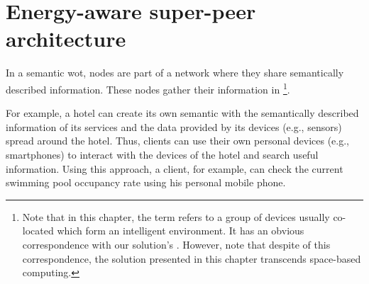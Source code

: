 \section{Energy-aware super-peer architecture} %
\label{proposal}




In a semantic \ac{wot}, nodes are part of a network where they share semantically described information.
These nodes gather their information in \Spaces{}
\footnote{
Note that in this chapter, the term \Space{} refers to a group of devices usually co-located which form an intelligent environment.
It has an obvious correspondence with our solution's \outerspace{}.
However, note that despite of this correspondence, the solution presented in this chapter transcends space-based computing.
}.

For example, a hotel can create its own semantic \Space{} with the semantically described information of its services and the data provided by its devices (e.g., sensors) spread around the hotel.
Thus, clients can use their own personal devices (e.g., smartphones) to interact with the devices of the hotel and search useful information.
Using this approach, a client, for example, can check the current swimming pool occupancy rate using his personal mobile phone.

